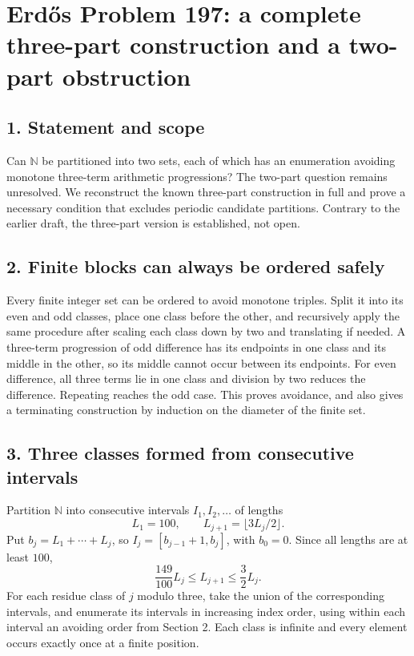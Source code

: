 \section*{Erd\H{o}s Problem 197: a complete three-part construction and a two-part obstruction}

\subsection*{1. Statement and scope}
Can $\mathbb N$ be partitioned into two sets, each of which has an enumeration avoiding monotone three-term arithmetic progressions? The two-part question remains unresolved. We reconstruct the known three-part construction in full and prove a necessary condition that excludes periodic candidate partitions. Contrary to the earlier draft, the three-part version is established, not open.

\subsection*{2. Finite blocks can always be ordered safely}
Every finite integer set can be ordered to avoid monotone triples. Split it into its even and odd classes, place one class before the other, and recursively apply the same procedure after scaling each class down by two and translating if needed. A three-term progression of odd difference has its endpoints in one class and its middle in the other, so its middle cannot occur between its endpoints. For even difference, all three terms lie in one class and division by two reduces the difference. Repeating reaches the odd case. This proves avoidance, and also gives a terminating construction by induction on the diameter of the finite set.

\subsection*{3. Three classes formed from consecutive intervals}
Partition $\mathbb N$ into consecutive intervals $I_1,I_2,\ldots$ of lengths
\[
 L_1=100,\qquad L_{j+1}=\lfloor3L_j/2\rfloor.
\]
Put $b_j=L_1+\cdots+L_j$, so $I_j=[b_{j-1}+1,b_j]$, with $b_0=0$. Since all lengths are at least $100$,
\[
 \frac{149}{100}L_j\le L_{j+1}\le\frac32L_j.\tag{1}
\]
For each residue class of $j$ modulo three, take the union of the corresponding intervals, and enumerate its intervals in increasing index order, using within each interval an avoiding order from Section 2. Each class is infinite and every element occurs exactly once at a finite position.

